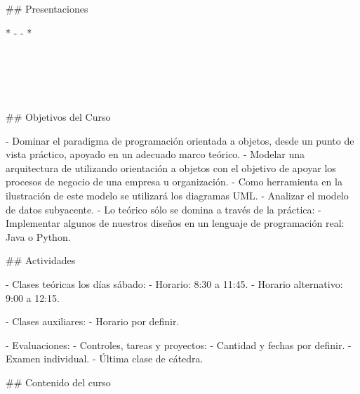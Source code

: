 ## Presentaciones

* 
    - 
    - 
    \pause
* 
    \pause

    \vspace{-6mm}
    \begin{center}
    \hspace{20mm}\begin{customRoundedBox}{}
    \centering
        \\
        \vspace{4mm}
        \\
    \end{customRoundedBox}
    
    \hspace{60mm}\begin{customRoundedBox}{}
    \centering
        \\
    \end{customRoundedBox}
    \end{center}

## Objetivos del Curso

- Dominar el paradigma de programación orientada a objetos, desde un punto de vista 
  práctico, apoyado en un adecuado marco teórico.
  \pause
- Modelar una arquitectura de  utilizando orientación a objetos
  con el objetivo de apoyar los procesos de negocio
  de una empresa u organización.
  \pause
- Como herramienta en la ilustración de este modelo se utilizará los diagramas UML.
  \pause
- Analizar el modelo de datos subyacente.
  \pause
- Lo teórico sólo se domina a través de la práctica: 
    - Implementar algunos de nuestros diseños en un lenguaje de programación real: Java o Python.

## Actividades

- Clases teóricas los días sábado:
    - Horario: 8:30 a 11:45.
    - Horario alternativo: 9:00 a 12:15.

- Clases auxiliares:
    - Horario por definir.

- Evaluaciones:
    - Controles, tareas y proyectos:
        - Cantidad y fechas por definir.
    - Examen individual.
        - Última clase de cátedra.


## Contenido del curso

